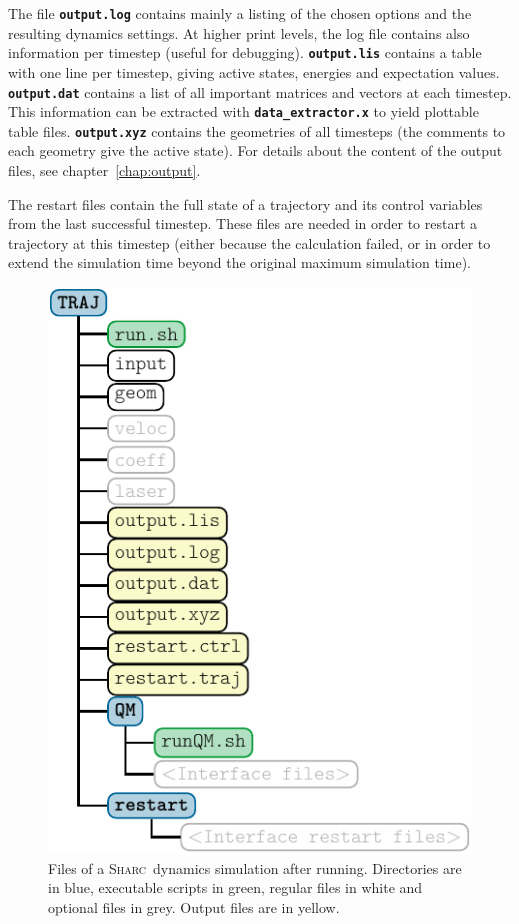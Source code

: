\documentclass[a4paper,11pt,DIV=15,openany,twoside=false]{scrbook}
\newcommand{\sharc}{\textsc{Sharc}}
\newcommand{\ttt}[1]{\textbf{\texttt{#1}}}
\begin{document}
The file \ttt{output.log} contains mainly a listing of the chosen options and the resulting dynamics settings. At higher print levels, the log file contains also information per timestep (useful for debugging). \ttt{output.lis} contains a table with one line per timestep, giving active states, energies and expectation values. \ttt{output.dat} contains a list of all important matrices and vectors at each timestep. This information can be extracted with \ttt{data\_extractor.x} to yield plottable table files. \ttt{output.xyz} contains the geometries of all timesteps (the comments to each geometry give the active state).
For details about the content of the output files, see chapter~\ref{chap:output}.

The restart files contain the full state of a trajectory and its control variables from the last successful timestep. These files are needed in order to restart a trajectory at this timestep (either because the calculation failed, or in order to extend the simulation time beyond the original maximum simulation time). 

\begin{figure}[h!]
  \centering
  \includegraphics[scale=1]{img/dir_traj/dir_traj_after.pdf}
  \caption{Files of a \sharc\ dynamics simulation after running. Directories are in blue, executable scripts in green, regular files in white and optional files in grey. Output files are in yellow.}
  \label{fig:dir_traj_after}
\end{figure}
\end{document}
